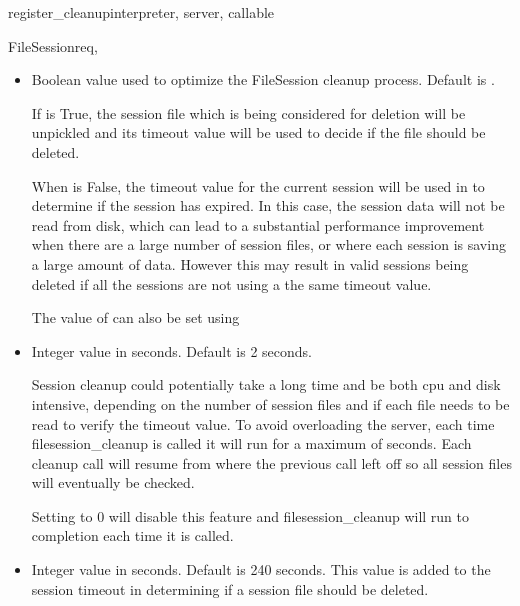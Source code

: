 \begin{funcdesc}{register_cleanup}{interpreter, server, callable}
\begin{classdesc}{FileSession}{req, }
\begin{itemize}
    The value of  can also be set using
    .
    
  \item
    Boolean value used to optimize the FileSession cleanup process.
    Default is .
    
    If  is True, the session file which is being 
    considered for deletion will be unpickled and its timeout value
    will be used to decide if the file should be deleted. 
    
    When  is False, the timeout value for the current
    session will be used in to determine if the session has expired. In
    this case, the session data will not be read from disk, which can
    lead to a substantial performance improvement when there are a large
    number of session files, or where each session is saving a large 
    amount of data. However this may result in valid sessions being
    deleted if all the sessions are not using a the same timeout value.
    
    The value of  can also be set using
    
  \item
    Integer value in seconds. Default is 2 seconds.

    Session cleanup could potentially take a long time and be both cpu
    and disk intensive, depending on the number of session files and if
    each file needs to be read to verify the timeout value. To avoid
    overloading the server, each time filesession_cleanup is called it
    will run for a maximum of  seconds.
    Each cleanup call will resume from where the previous call left off
    so all session files will eventually be checked.

    Setting  to 0 will disable this 
    feature and filesession_cleanup will run to completion each time it
    is called.

  \item
    Integer value in seconds. Default is 240 seconds. This value is added
    to the session timeout in determining if a session file should be 
    deleted.
 

\end{itemize}
\end{classdesc}
\end{funcdesc}
